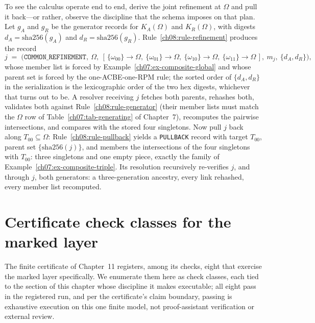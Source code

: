 \begin{example}\label{ch08:ex-derived}
To see the calculus operate end to end, derive the joint refinement at $\Omega$ and pull it back---or rather, observe the discipline that the schema imposes on that plan. Let $g_{A}$ and $g_{R}$ be the generator records for $K_{A}(\Omega)$ and $K_{R}(\Omega)$, with digests $d_{A}=\mathrm{sha256}(g_{A})$ and $d_{R}=\mathrm{sha256}(g_{R})$. Rule~\ref{ch08:rule-refinement} produces the record
\[
j \;=\; \bigl(\texttt{COMMON\_REFINEMENT},\ \Omega,\ [\,\{\omega_{00}\}\to\Omega,\ \{\omega_{01}\}\to\Omega,\ \{\omega_{10}\}\to\Omega,\ \{\omega_{11}\}\to\Omega\,],\ m_{j},\ \{d_{A},d_{R}\}\bigr),
\]
whose member list is forced by Example~\ref{ch07:ex-composite-global} and whose parent set is forced by the one-ACBE-one-RPM rule; the sorted order of $\{d_{A},d_{R}\}$ in the serialization is the lexicographic order of the two hex digests, whichever that turns out to be. A resolver receiving $j$ fetches both parents, rehashes both, validates both against Rule~\ref{ch08:rule-generator} (their member lists must match the $\Omega$ row of Table~\ref{ch07:tab-generating} of Chapter~7), recomputes the pairwise intersections, and compares with the stored four singletons. Now pull $j$ back along $T_{00}\subseteq\Omega$: Rule~\ref{ch08:rule-pullback} yields a \texttt{PULLBACK} record with target $T_{00}$, parent set $\{\mathrm{sha256}(j)\}$, and members the intersections of the four singletons with $T_{00}$: three singletons and one empty piece, exactly the family of Example~\ref{ch07:ex-composite-triple}. Its resolution recursively re-verifies $j$, and through $j$, both generators: a three-generation ancestry, every link rehashed, every member list recomputed.
\end{example}

\section{Certificate check classes for the marked layer}\label{ch08:sec-checks}

The finite certificate of Chapter~11 registers, among its checks, eight that exercise the marked layer specifically. We enumerate them here as check classes, each tied to the section of this chapter whose discipline it makes executable; all eight pass in the registered run, and per the certificate's claim boundary, passing is exhaustive execution on this one finite model, not proof-assistant verification or external review.

